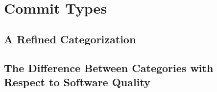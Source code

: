 \section{Commit Types}
\subsection{A Refined Categorization}
\subsection{The Difference Between Categories with Respect to Software Quality}
